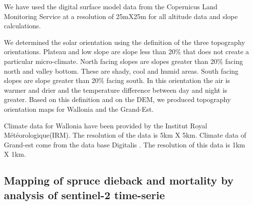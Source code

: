 \documentclass[3p,procedia]{elsarticle}
\begin{document}
We have used the digital surface model data from the Copernicus Land Monitoring Service \citep{DEM_copernicus}  at a resolution of 25mX25m for all altitude data and slope calculations.

We determined the solar orientation using the \cite{Delvaux_galoux} definition of the three topography orientations.
Plateau and low slope are slope less than  20\% that does not create a particular micro-climate. 
North facing slopes are slopes greater than  20\% facing north and valley bottom. 
These are shady, cool and humid areas. 
South facing slopes are slope greater than  20\% facing south. 
In this orientation the air is warmer and drier and the temperature difference between day and night is greater.
Based on this definition and on the DEM, we produced topography orientation  maps for Wallonia and the Grand-Est.




Climate data for Wallonia have been provided by the Institut Royal Météorologique(IRM). The resolution of the data is 5km X 5km. Climate data of  Grand-est come from the data base Digitalis \citep{piedallu_presentation_2014}. The resolution of this data is 1km X 1km.


\subsection{Mapping of spruce dieback and mortality by analysis of sentinel-2 time-serie}
\end{document}

